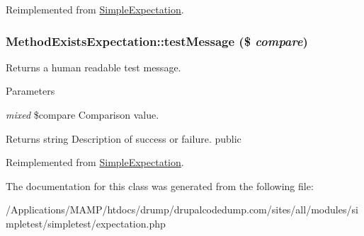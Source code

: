 Reimplemented from \hyperlink{class_simple_expectation_aa2b98f827e7487ebe12cedb9ad39d061}{SimpleExpectation}.\hypertarget{class_method_exists_expectation_a858774c75ad642a628c27a08adb9983b}{
\subsubsection[{testMessage}]{\setlength{\rightskip}{0pt plus 5cm}MethodExistsExpectation::testMessage (\$ {\em compare})}}
\label{class_method_exists_expectation_a858774c75ad642a628c27a08adb9983b}
Returns a human readable test message. 
\begin{DoxyParams}{Parameters}
\item[{\em mixed}]\$compare Comparison value. \end{DoxyParams}
\begin{DoxyReturn}{Returns}
string Description of success or failure.  public 
\end{DoxyReturn}


Reimplemented from \hyperlink{class_simple_expectation_a15b69edf659c76f6543aa98d8d85b025}{SimpleExpectation}.

The documentation for this class was generated from the following file:\begin{DoxyCompactItemize}
\item 
/Applications/MAMP/htdocs/drump/drupalcodedump.com/sites/all/modules/simpletest/simpletest/expectation.php\end{DoxyCompactItemize}
